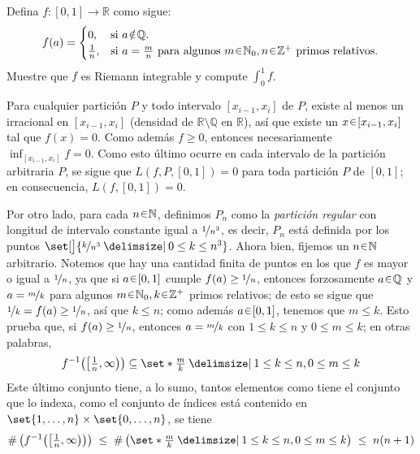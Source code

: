 
\setcounter{eje}{0}
\begin{ejer}
Defina $f \colon [0,1] \to \mathbb{R}$ como sigue:
$$
f(a) =%
\begin{cases} 
0, %
&\text{si $a \noten \mathbb{Q}$.} \\
\frac{1}{n}, %
&\text{si $a=\frac{m}{n}$ para algunos $m\en\mathbb{N}_0,n\en\mathbb{Z}^+$ primos relativos.}
\end{cases}
$$
Muestre que $f$ es Riemann integrable y compute $\int_0^1 f$.
\end{ejer}
\begin{sol}
Para cualquier partición $P$ y todo intervalo $[x_{i-1},x_i]$ de $P$, existe al menos un irracional en $[x_{i-1},x_i]$ (densidad de $\mathbb{R}\setminus\mathbb{Q}$ en $\mathbb{R}$), así que existe un $x \en [x_{i-1},x_i]$ tal que $f(x) = 0$. Como además $f \ge 0$, entonces necesariamente $\inf_{[x_{i-1},x_i]}f = 0$. Como esto último ocurre en cada intervalo de la partición arbitraria $P$, se sigue que $L(f,P,[0,1]) = 0$ para toda partición $P$ de $[0,1]$; en consecuencia, $L(f,[0,1]) = 0$.\par
Por otro lado, para cada $n\en\mathbb{N}$, definimos $P_n$ como la \emph{partición regular} con longitud de intervalo constante igual a $\nicefrac{1}{n^3}$, es decir, $P_n$ está definida por los puntos $\set[\big]{\nicefrac{k}{n^3} \given 0 \leq k \leq n^3}$. Ahora bien, fijemos un $n\en\mathbb{N}$ arbitrario. Notemos que hay una cantidad finita de puntos en los que $f$ es mayor o igual a $\nicefrac{1}{n}$, ya que si $a\en[0,1]$ cumple $f(a) \geq \nicefrac{1}{n}$, entonces forzosamente $a\en\mathbb{Q}$ y $a=\nicefrac{m}{k}$ para algunos $m\en\mathbb{N}_0,k\en\mathbb{Z}^+$ primos relativos; de esto se sigue que $\nicefrac{1}{k} = f(a) \geq \nicefrac{1}{n}$, así que $k \leq n$; como además $a\en[0,1]$, tenemos que $m \leq k$. Esto prueba que, si $f(a) \geq \nicefrac{1}{n}$, entonces $a = \nicefrac{m}{k}$ con $1 \leq k \leq n$ y $0 \leq m \leq k$; en otras palabras, 
\[
f^{-1}\big(\big[\tfrac{1}{n},\infty\big)\big)%
\subseteq%
\set*{\tfrac{m}{k} \given 1 \leq k \leq n, 0 \leq m \leq k }
\]
Este último conjunto tiene, a lo sumo, tantos elementos como tiene el conjunto que lo indexa, como el conjunto de índices está contenido en $\set{1,\dots,n} \times\set{0,\dots,n}$, se tiene
\[
\operatorname{\#}\big(
    f^{-1}\big(\big[\tfrac{1}{n},\infty\big)\big)
\big)%
\;\leq\;%
\operatorname{\#}\big(
    \set*{\tfrac{m}{k} \given 1 \leq k \leq n, 0 \leq m \leq k }
\big)%
\;\leq\;%
n(n+1)
\]


\end{sol}
